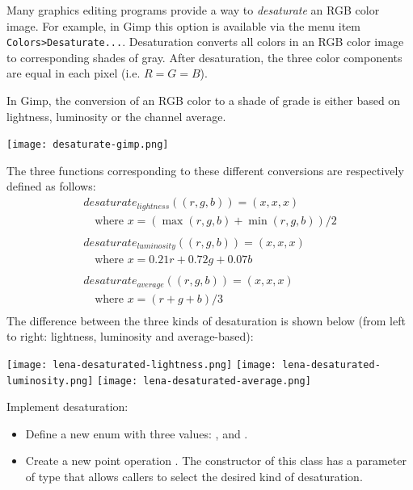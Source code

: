 \documentclass{book}
\begin{document}
\begin{exercise}\label{ex:desaturate}
Many graphics editing programs provide a way to \emph{desaturate} an RGB color image. For example, in Gimp this option is available via the menu item \texttt{Colors>Desaturate...}. Desaturation converts all colors in an RGB color image to corresponding shades of gray. After desaturation, the three color components are equal in each pixel (i.e. $R=G=B$).

In Gimp, the conversion of an RGB color to a shade of grade is either based on lightness, luminosity or the channel average. 
\begin{center}
\texttt{[image: desaturate-gimp.png]}
\end{center}
The three functions corresponding to these different conversions are respectively defined as follows:
$$\begin{array}{l}
desaturate_{lightness}((r, g, b)) = (x, x, x)\\
\quad \text{where $x = (\max(r, g, b) + \min(r, g, b)) / 2$}\\
\\
desaturate_{luminosity}((r, g, b)) = (x, x, x)\\
\quad\text{where $x = 0.21 r + 0.72 g + 0.07 b$}\\
\\
desaturate_{average}((r, g, b)) = (x, x, x)\\
\quad\text{where $x = (r + g + b)/3$}\\
\end{array}$$
The difference between the three kinds of desaturation is shown below (from left to right: lightness, luminosity and average-based):
\begin{center}
\texttt{[image: lena-desaturated-lightness.png]}
\texttt{[image: lena-desaturated-luminosity.png]}
\texttt{[image: lena-desaturated-average.png]}
\end{center}
Implement desaturation:
\begin{itemize}
  \item Define a new enum  with three values: ,  and .
  \item Create a new point operation . The constructor of this class has a parameter of type  that allows callers to select the desired kind of desaturation.
\end{itemize}
\end{exercise}
\end{document}
